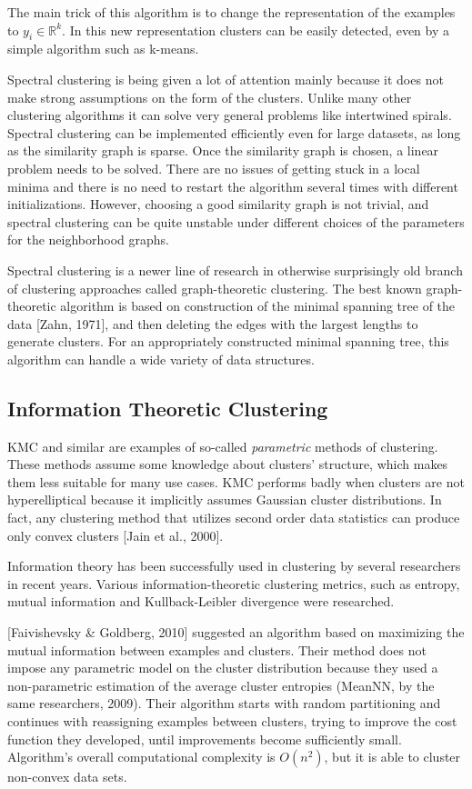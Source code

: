 \documentclass[conference]{IEEEtran}
\begin{document}
The main trick of this algorithm is to change the representation of the examples to $y_i \in \mathbb{R}^k$.
In this new representation clusters can be easily detected, even by a simple algorithm such as k-means.

Spectral clustering is being given a lot of attention mainly because it does not make strong
assumptions on the form of the clusters. Unlike many other clustering algorithms it
can solve very general problems like intertwined spirals.
Spectral clustering can be implemented efficiently even for large datasets, as long as
the similarity graph is sparse. Once the similarity graph is chosen, a linear problem needs to
be solved. There are no issues of getting stuck in a local minima and there is no need to
restart the algorithm several times with different initializations. However, choosing
a good similarity graph is not trivial, and spectral clustering can
be quite unstable under different choices of the parameters for the neighborhood graphs.

Spectral clustering is a newer line of research in otherwise surprisingly old branch of clustering
approaches called graph-theoretic clustering. The best known graph-theoretic algorithm is
based on construction of the minimal spanning tree of the data [Zahn, 1971], and then deleting
the edges with the largest lengths to generate clusters. For an appropriately constructed minimal
spanning tree, this algorithm can handle a wide variety of data structures.

\subsection{Information Theoretic Clustering}%
KMC and similar are examples of so-called \textit{parametric} methods of clustering. These
methods assume some knowledge about clusters' structure, which makes them less
suitable for many use cases. KMC performs badly when clusters are not hyperelliptical
because it implicitly assumes Gaussian cluster distributions. In fact, any clustering method
that utilizes second order data statistics can produce only convex clusters [Jain et al., 2000].

Information theory has been successfully used in clustering by several researchers in recent years.
Various information-theoretic clustering metrics, such as entropy, mutual information and
Kullback-Leibler divergence were researched.

[Faivishevsky \& Goldberg, 2010] suggested an algorithm based on maximizing the mutual information
between examples and clusters. Their method does not impose any parametric model on the cluster
distribution because they used a non-parametric estimation of the average cluster entropies (MeanNN,
by the same researchers, 2009). Their algorithm starts with random partitioning and continues
with reassigning examples between clusters, trying to improve the cost function they developed,
until improvements become sufficiently small. Algorithm's overall computational complexity is
$O(n^2)$, but it is able to cluster non-convex data sets.
\end{document}
